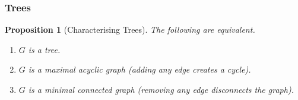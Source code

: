 \documentclass[11pt, mathserif]{beamer}
\newtheorem{proposition}{Proposition}
\theoremstyle{definition}
\theoremstyle{remark}
\begin{document}
\begin{frame}
  \frametitle{Trees}

\begin{proposition}[Characterising Trees]
	The following are equivalent.
	\begin{enumerate}
		\item $G$ is a tree.
		\item $G$ is a maximal acyclic graph (adding any edge creates a cycle).
		\item $G$ is a minimal connected graph (removing any edge disconnects the graph).
	\end{enumerate}
\end{proposition}

\vspace{2\baselineskip}
\end{frame}
\end{document}
